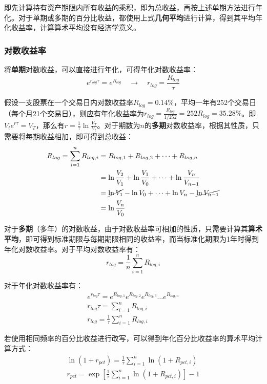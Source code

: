 \documentclass[11pt]{article}
\begin{document}
即先计算持有资产期限内所有收益的乘积，即为总收益，再按上述单期方法进行年化。对于单期或多期的百分比收益，都使用上式\textbf{几何平均}进行计算，得到其平均年化收益率，计算算术平均没有经济学意义。

\subsubsection*{对数收益率}

将\textbf{单期}对数收益，可以直接进行年化，可得年化对数收益率：
\begin{equation*}
    e^{r_{log}\tau} = e^{R_{log}} \quad\rightarrow\quad r_{log} = \frac{R_{log}}{\tau}
\end{equation*}

假设一支股票在一个交易日内对数收益率$R_{log}=0.14\%$，平均一年有252个交易日（每个月21个交易日），则应有年化收益率为$r_{log} = \frac{R_{log}}{1/252} = 252R_{log} = 35.28\%$。即$V_t e^{r\tau} = V_T$，那么有$r = \frac{1}{\tau} \ln \frac{V_T}{V_t}$。对于期数为$n$的\textbf{多期}对数收益率，根据其性质，只需要将每期收益相加，即可得到总收益：
\begin{align*}
    R_{log} = \sum^{n}_{i=1} R_{log,i} & = R_{log,1} + R_{log,2} + \dots + R_{log,n} \\ 
    &= \ln\frac{V_2}{V_1} + \ln\frac{V_1}{V_0} + \dots + \ln\frac{V_n}{V_{n-1}} \\
    &= \cancel{\ln V_1} - \ln V_0 + \dots + \ln V_n - \cancel{\ln V_{n-1}} \\
    &= \ln\frac{V_n}{V_0} 
\end{align*}

对于\textbf{多期}（多年）的对数收益，由于对数收益率可相加的性质，只需要计算其\textbf{算术平均}，即可得到标准期限与每期期限相同的收益率，而当标准化期限为1年时得到年化对数收益率。对于平均对数收益率有：
\begin{equation*}
    r_{log} = \frac{1}{n} \sum^{n}_{i=1} R_{log,i}    
\end{equation*}

对于年化对数收益率有：
\begin{gather*}
    e^{r_{log}\tau} = e^{R_{log,1}} e^{R_{log,2}} e^{R_{log,3}} \dots e^{R_{log,n}} \\
    r_{log}\tau = \sum^{n}_{i=1} R_{log,i} \\
    r_{log} = \frac{1}{\tau} \sum^{n}_{i=1} R_{log,i}    
\end{gather*}

若使用相同频率的百分比收益进行改写，可以得到年化百分比收益率的算术平均计算方式：
\begin{gather*}
    \ln (1 + r_{pct}) = \frac{1}{\tau} \sum^{n}_{i=1} \ln (1 + R_{pct,i}) \\
    r_{pct} = \exp \left[ \frac{1}{\tau} \sum^{n}_{i=1} \ln (1 + R_{pct,i}) \right] - 1
\end{gather*}
\end{document}

